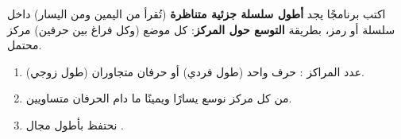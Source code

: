 \begin{statement}
اكتب برنامجًا يجد \textbf{أطول سلسلة جزئية متناظرة} (تُقرأ من اليمين ومن اليسار) داخل سلسلة  أو رمز، بطريقة \textbf{التوسع حول المركز}: كل موضع (وكل فراغ بين حرفين) مركز محتمل.
\end{statement}
\begin{stepsbox}\begin{enumerate}
\item عدد المراكز : حرف واحد (طول فردي) أو حرفان متجاوران (طول زوجي).
\item من كل مركز نوسع يسارًا ويمينًا ما دام الحرفان متساويين.
\item نحتفظ بأطول مجال \code{[bestStart, bestStart + bestLen)}.
\end{enumerate}\end{stepsbox}
